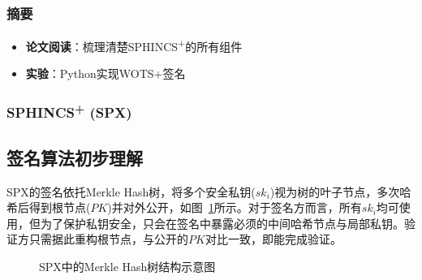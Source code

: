 \documentclass[slide]{../../custom}
\begin{document}
\begin{frame}
  \titlepage
\end{frame}

\begin{frame}
  \frametitle{摘要}
  \begin{itemize}
    \item \textbf{论文阅读}：梳理清楚SPHINCS\textsuperscript{+}的所有组件
    \item \textbf{实验}：Python实现WOTS+签名
  \end{itemize}
\end{frame}

\begin{frame}
  \frametitle{SPHINCS\textsuperscript{+} (SPX)}
  \subsection{签名算法初步理解}

  SPX的签名依托Merkle Hash树，将多个安全私钥($sk_i$)视为树的叶子节点，多次哈希后得到根节点($PK$)并对外公开，如图~\ref{fig:spx_sign}所示。对于签名方而言，所有$sk_i$均可使用，但为了保护私钥安全，只会在签名中暴露必须的中间哈希节点与局部私钥。验证方只需据此重构根节点，与公开的$PK$对比一致，即能完成验证。

  \begin{figure}[htbp]
    \centering
    \caption{SPX中的Merkle Hash树结构示意图}
    \label{fig:spx_sign}
  \end{figure}
\end{frame}
\end{document}

